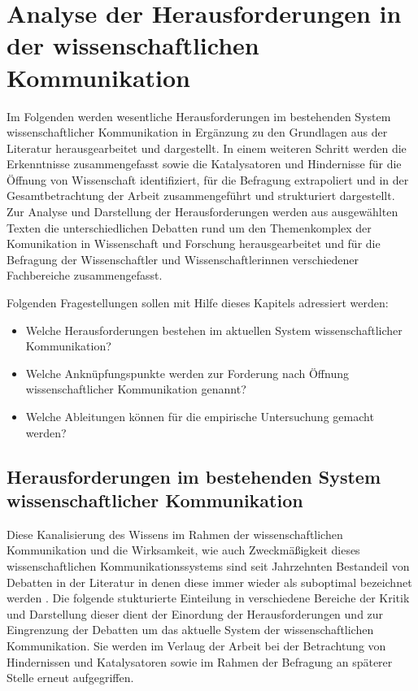 \chapter{Analyse der Herausforderungen in der wissenschaftlichen Kommunikation}

Im Folgenden werden wesentliche Herausforderungen im bestehenden System wissenschaftlicher Kommunikation in Ergänzung zu den Grundlagen aus der Literatur herausgearbeitet und dargestellt. In einem weiteren Schritt werden die Erkenntnisse zusammengefasst sowie die Katalysatoren und Hindernisse für die Öffnung von Wissenschaft identifiziert, für die Befragung extrapoliert und in der Gesamtbetrachtung der Arbeit zusammengeführt und strukturiert dargestellt. Zur Analyse und Darstellung der Herausforderungen werden aus ausgewählten Texten die unterschiedlichen Debatten rund um den Themenkomplex der Komunikation in Wissenschaft und Forschung herausgearbeitet und für die Befragung der Wissenschaftler und Wissenschaftlerinnen verschiedener Fachbereiche zusammengefasst.

Folgenden Fragestellungen sollen mit Hilfe dieses Kapitels adressiert werden:
\begin{itemize}
\item Welche Herausforderungen bestehen im aktuellen System wissenschaftlicher Kommunikation?
\item Welche Anknüpfungspunkte werden zur Forderung nach Öffnung wissenschaftlicher Kommunikation genannt?
\item Welche Ableitungen können für die empirische Untersuchung gemacht werden?
\end{itemize}

\section{Herausforderungen im bestehenden System wissenschaftlicher Kommunikation}

Diese Kanalisierung des Wissens im Rahmen der wissenschaftlichen Kommunikation und die Wirksamkeit, wie auch Zweckmäßigkeit dieses wissenschaftlichen Kommunikationssystems sind seit Jahrzehnten Bestandeil von Debatten in der Literatur \cite{suchen} in denen diese immer wieder als suboptimal bezeichnet werden \cite{suchen}. Die folgende stukturierte Einteilung in verschiedene Bereiche der Kritik und Darstellung dieser dient der Einordung der Herausforderungen und zur Eingrenzung der Debatten um das aktuelle System der wissenschaftlichen Kommunikation. Sie werden im Verlaug der Arbeit bei der Betrachtung von Hindernissen und Katalysatoren sowie im Rahmen der Befragung an späterer Stelle erneut aufgegriffen.

